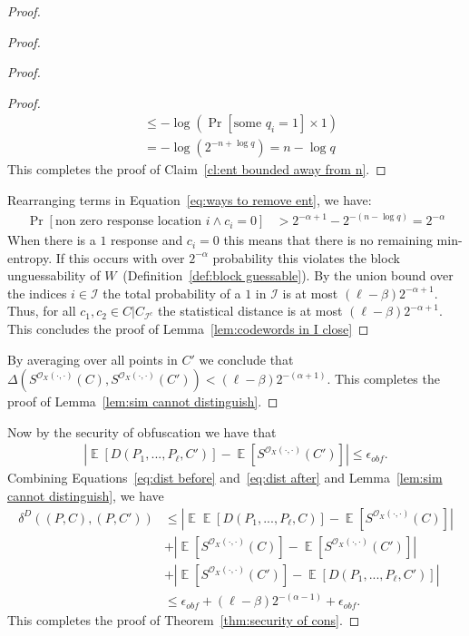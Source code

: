 \documentclass[11pt]{article}
\newcommand{\thref}[1]{\mbox{Theorem~\ref{#1}}}
\newcommand{\defref}[1]{\mbox{Definition~\ref{#1}}}
\newcommand{\lemref}[1]{\mbox{Lemma~\ref{#1}}}
\newcommand{\clref}[1]{\mbox{Claim~\ref{#1}}}
\DeclareMathOperator*{\expe}{\mathbb{E}}
\begin{document}
\begin{proof}
\begin{proof}
\begin{proof}
\begin{proof}
\begin{align*}
&\leq  -\log \left(\Pr[\text{some }q_i=1]\times 1\right)\\
&=-\log\left( 2^{-n+\log q} \right) = n-\log q
\end{align*}
This completes the proof of \clref{cl:ent bounded away from n}.
\end{proof}
\noindent
Rearranging terms in Equation~\ref{eq:ways to remove ent}, we have:
\begin{align*}
 \Pr[\text{non zero response location }i \wedge c_i=0] &>2^{-\alpha+1} - 2^{-(n-\log q)}=  2^{-\alpha}
 \end{align*}
 When there is a $1$ response and $c_i=0$ this means that there is no remaining min-entropy.  If this occurs with over $2^{-\alpha}$ probability this violates the block unguessability of $W$~(\defref{def:block guessable}).  By the union bound over the indices $i\in\mathcal{I}$ the total probability of a $1$ in $\mathcal{I}$ is at most $(\ell-\beta)2^{-\alpha+1}$. Thus, for all $c_1, c_2\in C| C_{\mathcal{I}^c}$ the statistical distance is at most $(\ell- \beta)2^{-\alpha+1}$.  This concludes the proof of \lemref{lem:codewords in I close}
\end{proof}
By averaging over all points in $C'$ we conclude that $\Delta(S^{\mathcal{O}_X(\cdot, \cdot)}(C), S^{\mathcal{O}_X(\cdot, \cdot)}(C')) < (\ell -\beta)2^{-(\alpha+1)}$.  This completes the proof of \lemref{lem:sim cannot distinguish}.
\end{proof}

\noindent Now by the security of obfuscation we have that 
\begin{align}
\label{eq:dist after}
|\expe [D(P_1,..., P_\ell, C') ]- \expe [S^{\mathcal{O}_X(\cdot, \cdot)}(C')] |\leq \epsilon_{obf}.
\end{align}
Combining Equations~\ref{eq:dist before} and~\ref{eq:dist after} and \lemref{lem:sim cannot distinguish}, we have
\begin{align*}
\delta^{D}(( P, C), (P, C'))&\leq |\expe \expe [D(P_1,..., P_\ell, C)] - \expe [S^{\mathcal{O}_X(\cdot, \cdot)}(C)]| \\
&+|\expe[S^{\mathcal{O}_X(\cdot, \cdot)}(C)] - \expe[S^{\mathcal{O}_X(\cdot, \cdot)}(C')] |\\
&+|\expe [S^{\mathcal{O}_X(\cdot, \cdot)}(C')] - \expe [D(P_1,..., P_\ell, C') ]|\\
&\leq \epsilon_{obf} + (\ell-\beta)2^{-(\alpha-1)}+\epsilon_{obf}.
\end{align*}
This completes the proof of \thref{thm:security of cons}.
\end{proof}
\end{document}
